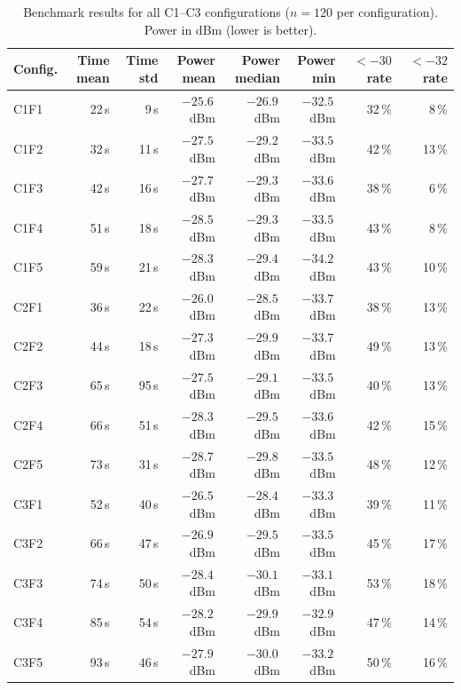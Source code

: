 \begin{table}[htbp]
    \centering
    \caption{Benchmark results for all C1--C3 configurations ($n = 120$ per configuration). Power in dBm (lower is better).}
    \label{tab:benchmark_full}
    \begin{tabular}{l r r r r r r r}
        \hline
        Config. & Time mean & Time std & Power mean & Power median & Power min & $<{-30}$ rate & $<{-32}$ rate \\
        \hline
        C1F1 & 22\,s  & 9\,s   & $-25.6$\,dBm & $-26.9$\,dBm & $-32.5$\,dBm & 32\,\% & 8\,\% \\
        C1F2 & 32\,s  & 11\,s  & $-27.5$\,dBm & $-29.2$\,dBm & $-33.5$\,dBm & 42\,\% & 13\,\% \\
        C1F3 & 42\,s  & 16\,s  & $-27.7$\,dBm & $-29.3$\,dBm & $-33.6$\,dBm & 38\,\% & 6\,\% \\
        C1F4 & 51\,s  & 18\,s  & $-28.5$\,dBm & $-29.3$\,dBm & $-33.5$\,dBm & 43\,\% & 8\,\% \\
        C1F5 & 59\,s  & 21\,s  & $-28.3$\,dBm & $-29.4$\,dBm & $-34.2$\,dBm & 43\,\% & 10\,\% \\
        \hline
        C2F1 & 36\,s  & 22\,s  & $-26.0$\,dBm & $-28.5$\,dBm & $-33.7$\,dBm & 38\,\% & 13\,\% \\
        C2F2 & 44\,s  & 18\,s  & $-27.3$\,dBm & $-29.9$\,dBm & $-33.7$\,dBm & 49\,\% & 13\,\% \\
        C2F3 & 65\,s  & 95\,s  & $-27.5$\,dBm & $-29.1$\,dBm & $-33.5$\,dBm & 40\,\% & 13\,\% \\
        C2F4 & 66\,s  & 51\,s  & $-28.3$\,dBm & $-29.5$\,dBm & $-33.6$\,dBm & 42\,\% & 15\,\% \\
        C2F5 & 73\,s  & 31\,s  & $-28.7$\,dBm & $-29.8$\,dBm & $-33.5$\,dBm & 48\,\% & 12\,\% \\
        \hline
        C3F1 & 52\,s  & 40\,s  & $-26.5$\,dBm & $-28.4$\,dBm & $-33.3$\,dBm & 39\,\% & 11\,\% \\
        C3F2 & 66\,s  & 47\,s  & $-26.9$\,dBm & $-29.5$\,dBm & $-33.5$\,dBm & 45\,\% & 17\,\% \\
        C3F3 & 74\,s  & 50\,s  & $-28.4$\,dBm & $-30.1$\,dBm & $-33.1$\,dBm & 53\,\% & 18\,\% \\
        C3F4 & 85\,s  & 54\,s  & $-28.2$\,dBm & $-29.9$\,dBm & $-32.9$\,dBm & 47\,\% & 14\,\% \\
        C3F5 & 93\,s  & 46\,s  & $-27.9$\,dBm & $-30.0$\,dBm & $-33.2$\,dBm & 50\,\% & 16\,\% \\
        \hline
    \end{tabular}
\end{table}

